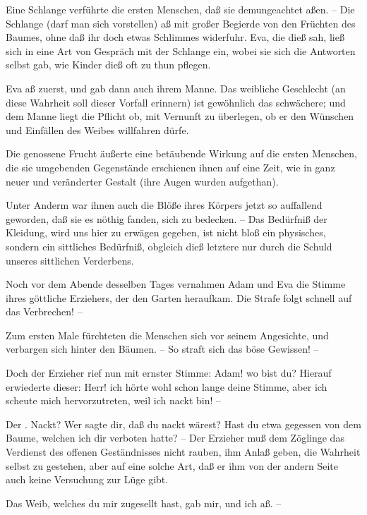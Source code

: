 \begin{RWanm}
\begin{aufza}
\item Eine Schlange verführte die ersten Menschen, daß sie demungeachtet aßen. -- Die Schlange (darf man sich vorstellen) aß mit großer Begierde von den Früchten des Baumes, ohne daß ihr doch etwas Schlimmes widerfuhr. Eva, die dieß sah, ließ sich in eine Art von Gespräch mit der Schlange ein, wobei sie sich die Antworten selbst gab, wie Kinder dieß oft zu thun pflegen.~
\item Eva aß zuerst, und gab dann auch ihrem Manne. Das weibliche Geschlecht (an diese Wahrheit soll dieser Vorfall erinnern) ist gewöhnlich das schwächere; und dem Manne liegt die Pflicht ob, mit Vernunft zu überlegen, ob er den Wünschen und Einfällen des Weibes willfahren dürfe.
\item Die genossene Frucht äußerte eine betäubende Wirkung auf die ersten Menschen, die sie umgebenden Gegenstände erschienen ihnen auf eine Zeit, wie in ganz neuer und veränderter Gestalt (ihre Augen wurden aufgethan).
\item Unter Anderm war ihnen auch die Blöße ihres Körpers jetzt so auffallend geworden, daß sie es nöthig fanden, sich zu bedecken. -- Das Bedürfniß der Kleidung, wird uns hier zu erwägen gegeben, ist nicht bloß ein physisches, sondern ein sittliches Bedürfniß, obgleich dieß letztere nur durch die Schuld unseres sittlichen Verderbens.
\item Noch vor dem Abende desselben Tages vernahmen Adam und Eva die Stimme ihres göttliche Erziehers, der den Garten heraufkam. Die Strafe folgt schnell auf das Verbrechen! --
\item Zum ersten Male fürchteten die Menschen sich vor seinem Angesichte, und verbargen sich hinter den Bäumen. -- So straft sich das böse Gewissen! --
\item Doch der Erzieher rief nun mit ernster Stimme: Adam! wo bist du? Hierauf erwiederte dieser: Herr! ich hörte wohl schon lange deine Stimme, aber ich scheute mich hervorzutreten, weil ich nackt bin! --\par
Der . Nackt? Wer sagte dir, daß du nackt wärest? Hast du etwa gegessen von dem Baume, welchen ich dir verboten hatte? -- Der Erzieher muß dem Zöglinge das Verdienst des offenen Geständnisses nicht rauben, ihm Anlaß geben, die Wahrheit selbst zu gestehen, aber auf eine solche Art, daß er ihm von der andern Seite auch keine Versuchung zur Lüge gibt.\par
{} Das Weib, welches du mir zugesellt hast, gab mir, und ich aß. --\par

\end{aufza}
\end{RWanm}
